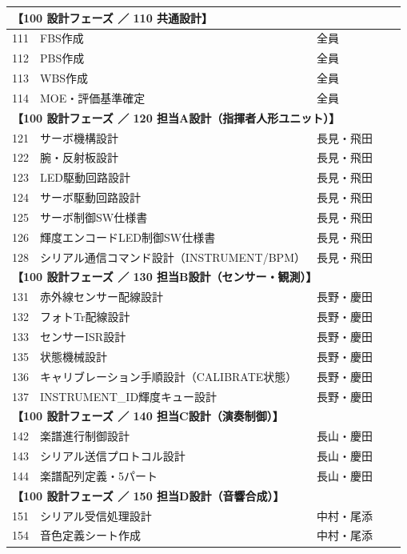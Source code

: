 \begin{longtable}{p{0.9cm}p{7cm}p{2.5cm}p{2cm}p{2cm}}
\multicolumn{5}{l}{\textbf{【100 設計フェーズ ／ 110 共通設計】}} \\
\midrule
111 & FBS作成 & 全員 &  &  \\
112 & PBS作成 & 全員 &  &  \\
113 & WBS作成 & 全員 &  &  \\
114 & MOE・評価基準確定 & 全員 &  &  \\
\midrule
\multicolumn{5}{l}{\textbf{【100 設計フェーズ ／ 120 担当A設計（指揮者人形ユニット）】}} \\
\midrule
121 & サーボ機構設計 & 長見・飛田 &  &  \\
122 & 腕・反射板設計 & 長見・飛田 &  &  \\
123 & LED駆動回路設計 & 長見・飛田 &  &  \\
124 & サーボ駆動回路設計 & 長見・飛田 &  &  \\
125 & サーボ制御SW仕様書 & 長見・飛田 &  &  \\
126 & 輝度エンコードLED制御SW仕様書 & 長見・飛田 &  &  \\
128 & シリアル通信コマンド設計（INSTRUMENT/BPM） & 長見・飛田 &  &  \\
\midrule
\multicolumn{5}{l}{\textbf{【100 設計フェーズ ／ 130 担当B設計（センサー・観測）】}} \\
\midrule
131 & 赤外線センサー配線設計 & 長野・慶田 &  &  \\
132 & フォトTr配線設計 & 長野・慶田 &  &  \\
133 & センサーISR設計 & 長野・慶田 &  &  \\
135 & 状態機械設計 & 長野・慶田 &  &  \\
136 & キャリブレーション手順設計（CALIBRATE状態） & 長野・慶田 &  &  \\
137 & INSTRUMENT\_ID輝度キュー設計 & 長野・慶田 &  &  \\
\midrule
\multicolumn{5}{l}{\textbf{【100 設計フェーズ ／ 140 担当C設計（演奏制御）】}} \\
\midrule
142 & 楽譜進行制御設計 & 長山・慶田 &  &  \\
143 & シリアル送信プロトコル設計 & 長山・慶田 &  &  \\
144 & 楽譜配列定義・5パート & 長山・慶田 &  &  \\
\midrule
\multicolumn{5}{l}{\textbf{【100 設計フェーズ ／ 150 担当D設計（音響合成）】}} \\
\midrule
151 & シリアル受信処理設計 & 中村・尾添 &  &  \\
154 & 音色定義シート作成 & 中村・尾添 &  &  \\

\end{longtable}
